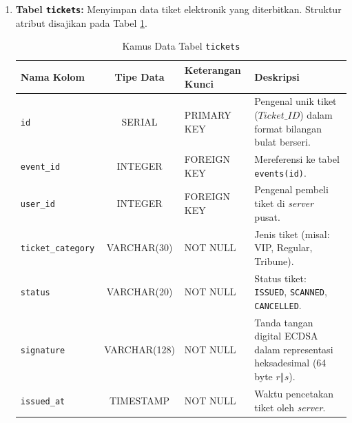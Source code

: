 \begin{enumerate}
    \item \textbf{Tabel \texttt{tickets}:} Menyimpan data tiket elektronik yang diterbitkan. Struktur atribut disajikan pada Tabel \ref{tab:table_tickets}.
    \begin{table}[htbp]
        \caption{Kamus Data Tabel \texttt{tickets}}
        \label{tab:table_tickets}
        \centering
        \begin{tabularx}{\textwidth}{ l c l X }
            \toprule
            \textbf{Nama Kolom} & \textbf{Tipe Data} & \textbf{Keterangan Kunci} & \textbf{Deskripsi} \\
            \midrule
            \texttt{id} & SERIAL & PRIMARY KEY & Pengenal unik tiket ($Ticket\_ID$) dalam format bilangan bulat berseri. \\
            \texttt{event\_id} & INTEGER & FOREIGN KEY & Mereferensi ke tabel \texttt{events(id)}. \\
            \texttt{user\_id} & INTEGER & FOREIGN KEY & Pengenal pembeli tiket di \textit{server} pusat. \\
            \texttt{ticket\_category} & VARCHAR(30) & NOT NULL & Jenis tiket (misal: VIP, Regular, Tribune). \\
            \texttt{status} & VARCHAR(20) & NOT NULL & Status tiket: \texttt{ISSUED}, \texttt{SCANNED}, \texttt{CANCELLED}. \\
            \texttt{signature} & VARCHAR(128) & NOT NULL & Tanda tangan digital ECDSA dalam representasi heksadesimal (64 byte $r \mathbin{\Vert} s$). \\
            \texttt{issued\_at} & TIMESTAMP & NOT NULL & Waktu pencetakan tiket oleh \textit{server}. \\
            \bottomrule
        \end{tabularx}
    \end{table}


\end{enumerate}
